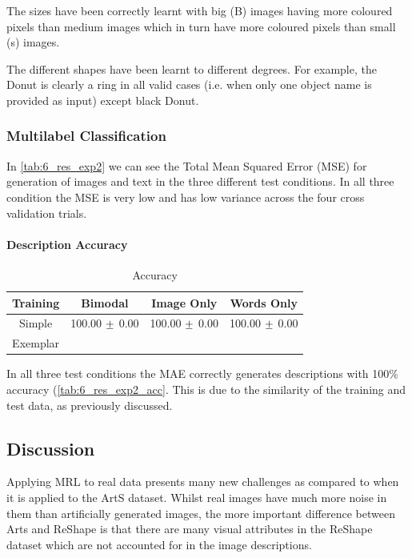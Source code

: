 The sizes have been correctly learnt with big (B) images having more coloured pixels than medium images which in turn have more coloured pixels than small (s) images.

The different shapes have been learnt to different degrees. For example, the Donut is clearly a ring in all valid cases (i.e. when only one object name is provided as input) except black Donut.



\subsubsection{Multilabel Classification}



In \autoref{tab:6_res_exp2} we can see the Total Mean Squared Error (MSE) for generation of images and text in the three different test conditions. In all three condition the MSE is very low and has low variance across the four cross validation trials.

\paragraph{Description Accuracy}
\begin{table}[h!]
\centering
	\begin{tabular}{|c|c|c|c|}
	\hline
\textbf{Training}	 & 	\textbf{Bimodal} & \textbf{Image Only} 	& 	\textbf{Words Only} \\ \hline
Simple &  100.00 $\mypm$ 0.00 & 100.00 $\mypm$ 0.00 & 100.00 $\mypm$ 0.00 \\ \hline
Exemplar  \\ \hline
\end{tabular}
\caption{Accuracy}
\label{tab:6_res_exp2_acc}
\end{table}


In all three test conditions the MAE correctly generates descriptions with 100\% accuracy (\autoref{tab:6_res_exp2_acc}. This is due to the similarity of the training and test data, as previously discussed.

\subsection{Discussion}

Applying MRL to real data presents many new challenges as compared to when it is applied to the ArtS dataset. Whilst real images have much more noise in them than artificially generated images, the more important difference between Arts and ReShape is that there are many visual attributes in the ReShape dataset which are not accounted for in the image descriptions.

